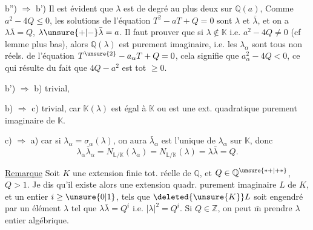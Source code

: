 b'') $\Longrightarrow$ b') Il est évident que $\lambda$ est de degré au plus
deux sur  $\mathbb Q(a)$,  
 Comme $a^2-4Q\le0$, les solutions de l'équation
$T^2-aT+Q=0$ sont $\lambda$ et $\bar\lambda$, et on a $\lambda\bar\lambda=Q$, $\lambda\unsure{+|-}\bar\lambda=a$.
 Il faut prouver que si $\lambda\notin\mathbb K$ i.e. $a^2-4Q\ne0$ (cf lemme
plus bas), alors  $\mathbb Q(\lambda)$ est purement imaginaire, i.e.
les $\lambda_\alpha$ sont tous non réels.  
de l'équation $T^{\unsure{2}}-a_\alpha T+Q=0$, cela signifie que
$a_\alpha^2-4Q<0$, ce qui résulte du fait que $4Q-a^2$ est tot $\ge0$.

b') $\Rightarrow$ b) trivial, 

b) $\Longrightarrow$ c) trivial, car $\mathbb K(\lambda)$ est égal à $\mathbb K$ ou est une ext.
quadratique purement imaginaire de $\mathbb K$.

c) $\Longrightarrow$ a) car si $\lambda_\alpha=\sigma_\alpha(\lambda)$, on aura  
$\bar\lambda_\alpha$ est l'unique   de $\lambda_\alpha$ sur $\mathbb K$,  donc
\[
\lambda_\alpha\bar\lambda_\alpha=N_{\mathbb L/\mathbb K}(\lambda_\alpha)=N_{\mathbb L/\mathbb K}(\lambda)=\lambda\bar\lambda=Q.
\]


\uline{Remarque} Soit $K$ une extension finie tot. réelle de $\mathbb Q$,
et $Q\in\mathbb Q^{\unsure{*+|+*}}$, $Q>1$. Je dis qu'il existe alors une extension quadr.
purement imaginaire $L$ de $K$,  et un
entier $i\ge\unsure{0|1}$,  tels que $\deleted{\unsure{K}}L$ soit engendré
 par un élément $\lambda$ tel que $\lambda\bar\lambda=Q^i$ i.e. $|\lambda|^2=Q^i$.
Si $Q\in\mathbb Z$, on peut $\bar{\mathrm m}$ prendre $\lambda$ entier algébrique.

